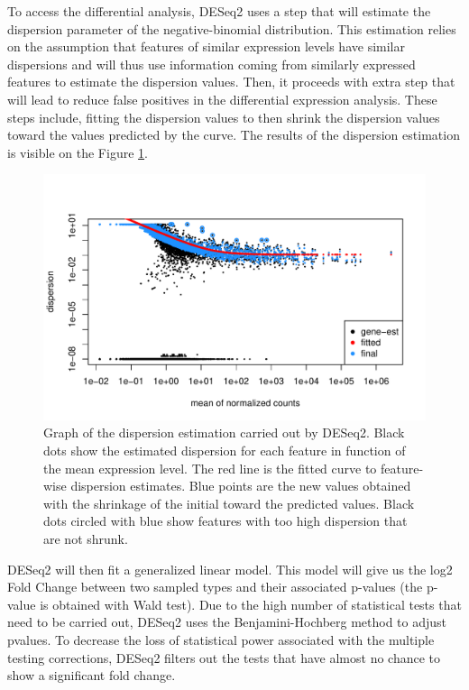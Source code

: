\documentclass[a4paper, 11pt]{article}
\begin{document}
\begin{multicols}{2}
To access the differential analysis, DESeq2 uses a step that will estimate the dispersion parameter of the negative-binomial distribution. This estimation relies on the assumption that features of similar expression levels have similar dispersions and will thus use information coming from similarly expressed features to estimate the dispersion values. Then, it proceeds with extra step that will lead to reduce false positives in the differential expression analysis. These steps include, fitting the dispersion values to then shrink the dispersion values toward the values predicted by the curve. The results of the dispersion estimation is visible on the Figure \ref{fig:dispersion}.
\begin{figure}[H]
	\centering
	\includegraphics[width=\columnwidth]{Figures/differential_analysis/dispersion.pdf}
	\caption{\footnotesize{Graph of the dispersion estimation carried out by DESeq2. Black dots show the estimated dispersion for each feature in function of the mean expression level. The red line is the fitted curve to feature-wise dispersion estimates. Blue points are the new values obtained with the shrinkage of the initial toward the predicted values. Black dots circled with blue show features with too high dispersion that are not shrunk.}}
	\label{fig:dispersion}
\end{figure}

DESeq2 will then fit a generalized linear model. This model will give us the log2 Fold Change between two sampled types and their associated p-values (the p-value is obtained with Wald test). Due to the high number of statistical tests that need to be carried out, DESeq2 uses the Benjamini-Hochberg method to adjust pvalues. To decrease the loss of statistical power associated with the multiple testing corrections, DESeq2 filters out the tests that have almost no chance to show a significant fold change. 


\end{multicols}
\end{document}
